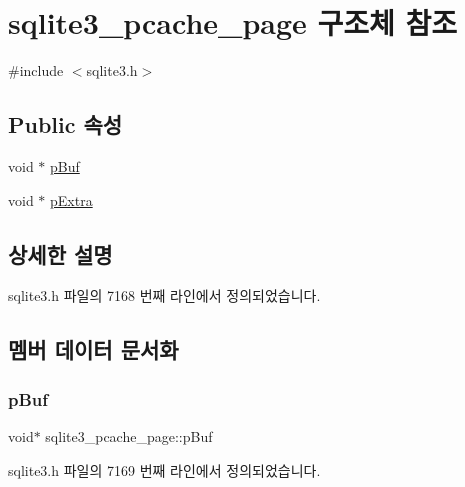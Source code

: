 \hypertarget{structsqlite3__pcache__page}{}\section{sqlite3\+\_\+pcache\+\_\+page 구조체 참조}
\label{structsqlite3__pcache__page}


{\ttfamily \#include $<$sqlite3.\+h$>$}

\subsection*{Public 속성}
\begin{DoxyCompactItemize}
\item 
void $\ast$ \hyperlink{structsqlite3__pcache__page_a19aa6f5638fe2d4eee32aed37a119288}{p\+Buf}
\item 
void $\ast$ \hyperlink{structsqlite3__pcache__page_a6356a15fc426a7558ddf34038f70a65f}{p\+Extra}
\end{DoxyCompactItemize}


\subsection{상세한 설명}


sqlite3.\+h 파일의 7168 번째 라인에서 정의되었습니다.



\subsection{멤버 데이터 문서화}
\mbox{\label{structsqlite3__pcache__page_a19aa6f5638fe2d4eee32aed37a119288}} 
\subsubsection{\texorpdfstring{p\+Buf}{pBuf}}
{\footnotesize\ttfamily void$\ast$ sqlite3\+\_\+pcache\+\_\+page\+::p\+Buf}



sqlite3.\+h 파일의 7169 번째 라인에서 정의되었습니다.

\mbox{\label{structsqlite3__pcache__page_a6356a15fc426a7558ddf34038f70a65f}} 
